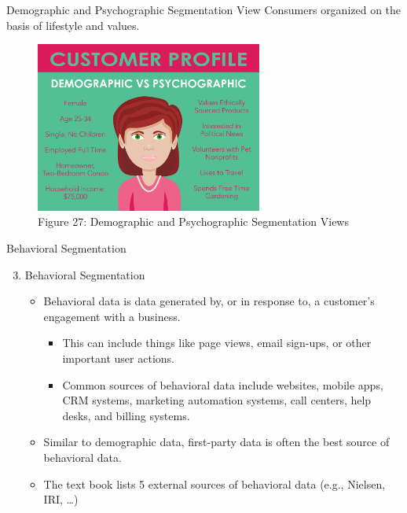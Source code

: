 \documentclass[pdf]{beamer}
\theoremstyle{remark}
\theoremstyle{definition}
\begin{document}
\begin{frame}[t]{Demographic and Psychographic Segmentation View}
Consumers organized on the basis of lifestyle and values. \\
\vspace{1.5ex}
\begin{figure}[htbp]
  \captionsetup{justification=centering}
  \includegraphics[height=5.6cm, trim=0.0cm 0.0cm 0.0cm 0.0cm width=5.6cm]{Images/Psychographic.png}
  \caption{Figure {\color{franklinblue} 27}: Demographic and Psychographic Segmentation Views}
\end{figure}
\end{frame}

\begin{frame}[t]{Behavioral Segmentation}
\begin{enumerate}
 \setcounter{enumi}{2}
 \item Behavioral Segmentation
  \begin{itemize}
    \item Behavioral data is data generated by, or in response to, a customer's engagement with a business. 
    \begin{itemize}
      \item This can include things like page views, email sign-ups, or other important user actions. 
      \item Common sources of behavioral data include websites, mobile apps, CRM systems, marketing automation systems, call centers, help desks, and billing systems.
    \end{itemize}
    \item Similar to demographic data, first-party data is often the best source of behavioral data.
    \item The text book lists 5 external sources of behavioral data (e.g., Nielsen, IRI, \ldots)
  \end{itemize}
\end{enumerate}
\end{frame}
\end{document}
